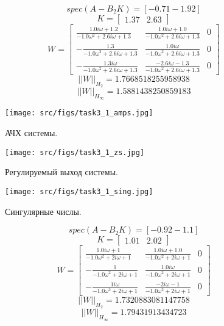 \[spec(A-B_2 K) = [-0.71 -1.92]\]
\[K = \begin{bmatrix}
  1.37 &  2.63
\end{bmatrix}\]
\[ W = \left[\begin{matrix}\frac{1.0 i \omega + 1.2}{- 1.0 \omega^{2} + 2.6 i \omega + 1.3} & \frac{1.0 i \omega + 1.0}{- 1.0 \omega^{2} + 2.6 i \omega + 1.3} & 0\\- \frac{1.3}{- 1.0 \omega^{2} + 2.6 i \omega + 1.3} & \frac{1.0 i \omega}{- 1.0 \omega^{2} + 2.6 i \omega + 1.3} & 0\\- \frac{1.3 i \omega}{- 1.0 \omega^{2} + 2.6 i \omega + 1.3} & \frac{- 2.6 i \omega - 1.3}{- 1.0 \omega^{2} + 2.6 i \omega + 1.3} & 0\end{matrix}\right]\]
\[||W||_{H_2} = 1.7668518255958938\]
\[||W||_{H_\infty} = 1.5881438250859183 \]

\begin{figure}[ht!]
    \centering
    \texttt{[image: src/figs/task3\_1\_amps.jpg]}
    \caption{АЧХ системы.}
    \label{fig:task3_1_amps}
  \end{figure}
  
  \begin{figure}[ht!]
    \centering
    \texttt{[image: src/figs/task3\_1\_zs.jpg]}
    \caption{Регулируемый выход системы.}
    \label{fig:task3_1_zs}
  \end{figure}
  
  \begin{figure}[ht!]
    \centering
    \texttt{[image: src/figs/task3\_1\_sing.jpg]}
    \caption{Сингулярные числы.}
    \label{fig:task3_1_sing}
  \end{figure}

\FloatBarrier

\[spec(A-B_2 K) = [-0.92 -1.1 ]\]
\[K = \begin{bmatrix}
  1.01 &  2.02
\end{bmatrix}\]
\[W = \left[\begin{matrix}\frac{1.0 i \omega + 1}{- 1.0 \omega^{2} + 2 i \omega + 1} & \frac{1.0 i \omega + 1.0}{- 1.0 \omega^{2} + 2 i \omega + 1} & 0\\- \frac{1}{- 1.0 \omega^{2} + 2 i \omega + 1} & \frac{1.0 i \omega}{- 1.0 \omega^{2} + 2 i \omega + 1} & 0\\- \frac{1 i \omega}{- 1.0 \omega^{2} + 2 i \omega + 1} & \frac{- 2 i \omega - 1}{- 1.0 \omega^{2} + 2 i \omega + 1} & 0\end{matrix}\right]\]
\[||W||_{H_2} = 1.7320883081147758\]
\[||W||_{H_\infty} = 1.79431913434723 \]

